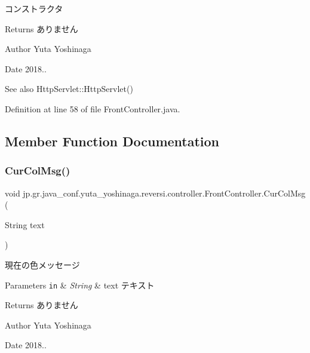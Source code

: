 コンストラクタ 

\begin{DoxyReturn}{Returns}
ありません 
\end{DoxyReturn}
\begin{DoxyAuthor}{Author}
Yuta Yoshinaga 
\end{DoxyAuthor}
\begin{DoxyDate}{Date}
2018.. 
\end{DoxyDate}
\begin{DoxySeeAlso}{See also}
Http\+Servlet\+::\+Http\+Servlet() 
\end{DoxySeeAlso}


Definition at line 58 of file Front\+Controller.\+java.



\subsection{Member Function Documentation}
\mbox{\label{classjp_1_1gr_1_1java__conf_1_1yuta__yoshinaga_1_1reversi_1_1controller_1_1_front_controller_ac49c44c8bb767770364c52164b699110}} 
\subsubsection{\texorpdfstring{Cur\+Col\+Msg()}{CurColMsg()}}
{\footnotesize\ttfamily void jp.\+gr.\+java\+\_\+conf.\+yuta\+\_\+yoshinaga.\+reversi.\+controller.\+Front\+Controller.\+Cur\+Col\+Msg (\begin{DoxyParamCaption}\item[{String}]{text }\end{DoxyParamCaption})}



現在の色メッセージ 


\begin{DoxyParams}[1]{Parameters}
\mbox{\tt in}  & {\em String} & text テキスト \\
\hline
\end{DoxyParams}
\begin{DoxyReturn}{Returns}
ありません 
\end{DoxyReturn}
\begin{DoxyAuthor}{Author}
Yuta Yoshinaga 
\end{DoxyAuthor}
\begin{DoxyDate}{Date}
2018.. 
\end{DoxyDate}


